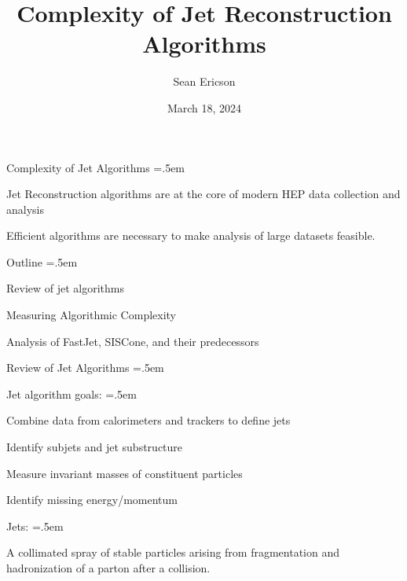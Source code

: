 \documentclass[xcolor={dvipsnames}]{beamer}
\title{Complexity of Jet Reconstruction Algorithms}
\author{Sean Ericson}
\institute{UO\\PHYS 662}
\date{March 18, 2024}
\let\olditemize=\itemize
\let\endolditemize=\enditemize
\renewenvironment{itemize}{\olditemize \itemsep=.5em }{\endolditemize}
\begin{document}
\frame{\titlepage}

\begin{frame}{Complexity of Jet Algorithms}
\begin{itemize}
    \item<1-> Jet Reconstruction algorithms are at the core of modern HEP data collection and analysis
    \item<2-> Efficient algorithms are necessary to make analysis of large datasets feasible.
    \item<3-> Outline
    \begin{itemize}
        \item<5-> Review of jet algorithms
        \item<6-> Measuring Algorithmic Complexity
        \item<7-> Analysis of FastJet, SISCone, and their predecessors
    \end{itemize}
\end{itemize}
\end{frame}

\begin{frame}{Review of Jet Algorithms}
\begin{itemize}
    \item<1-> Jet algorithm goals:
    \begin{itemize}
        \item<2-> Combine data from calorimeters and trackers to define jets
        \item<3-> Identify subjets and jet substructure
        \item<4-> Measure invariant masses of constituent particles
        \item<5-> Identify missing energy/momentum
    \end{itemize}
    \item<6-> Jets:
    \begin{itemize}
        \item<7-> A collimated spray of stable particles arising from fragmentation and hadronization of a parton after a collision.
    \end{itemize}
\end{itemize}
\end{frame}
\end{document}
